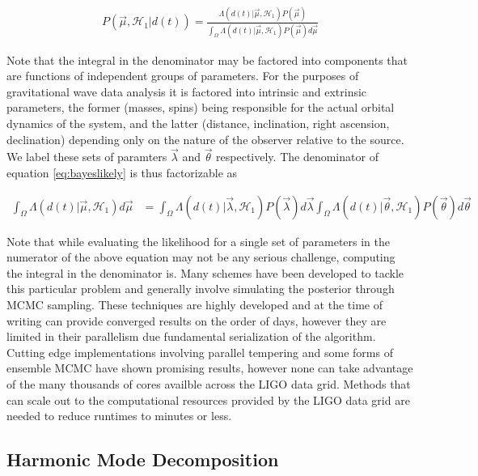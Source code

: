 \begin{align}\label{eq:bayeslikely}
P(\vec{\mu}, \mathcal{H}_1|d(t)) = \frac{\Lambda(d(t)|\vec{\mu}, \mathcal{H}_1)P(\vec{\mu})}{\int_{\Omega}\Lambda(d(t)|\vec{\mu}, \mathcal{H}_1)P(\vec{\mu})d\vec{\mu}}
\end{align}

Note that the integral in the denominator may be factored into components that are functions of independent groups of parameters. For the purposes of gravitational wave data analysis it is factored into intrinsic and extrinsic parameters, the former (masses, spins) being responsible for the actual orbital dynamics of the system, and the latter (distance, inclination, right ascension, declination) depending only on the nature of the observer relative to the source. We label these sets of paramters $\vec{\lambda}$ and $\vec{\theta}$ respectively. The denominator of equation \ref{eq:bayeslikely} is thus factorizable as 

\begin{align}
\int_{\Omega}\Lambda(d(t)|\vec{\mu}, \mathcal{H}_1)d\vec{\mu} &= \int_{\Omega}\Lambda(d(t)|\vec{\lambda}, \mathcal{H}_1)P(\vec{\lambda})d\vec{\lambda}\int_{\Omega}\Lambda(d(t)|\vec{\theta}, \mathcal{H}_1)P(\vec{\theta})d\vec{\theta} 
\end{align} 

Note that while evaluating the likelihood for a single set of parameters in the numerator of the above equation may not be any serious challenge, computing the integral in the denominator is. Many schemes \cite{rapidpe} \cite{lalinference} \cite{mcmc} have been developed to tackle this particular problem and generally involve simulating the posterior through MCMC sampling. These techniques are highly developed and at the time of writing can provide converged results on the order of days, however they are limited in their parallelism due fundamental serialization of the algorithm. Cutting edge implementations involving parallel tempering and some forms of ensemble MCMC have shown promising results, however none can take advantage of the many thousands of cores availble across the LIGO data grid. Methods that can scale out to the computational resources provided by the LIGO data grid are needed to reduce runtimes to minutes or less.   

\subsection{Harmonic Mode Decomposition}

